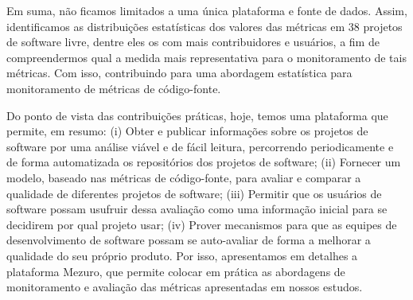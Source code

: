 \documentclass{llncs}
\begin{document}
Em suma, não ficamos limitados a uma única plataforma e fonte de dados. Assim,
identificamos as distribuições estatísticas dos valores das métricas em 38
projetos de software livre, dentre eles os com mais contribuidores e usuários,
a fim de compreendermos qual a medida mais representativa para o monitoramento
de tais métricas.
%
Com isso, contribuindo para uma abordagem estatística para monitoramento de
métricas de código-fonte.

Do ponto de vista das contribuições práticas, hoje, temos uma plataforma que
permite, em resumo: 
% 
(i) Obter e publicar informações sobre os projetos de software por uma análise
viável e de fácil leitura, percorrendo periodicamente e de forma automatizada
os repositórios dos projetos de software; 
% 
(ii) Fornecer um modelo, baseado nas métricas de código-fonte, para avaliar e
comparar a qualidade de diferentes projetos de software; 
% 
(iii) Permitir que os usuários de software possam usufruir dessa avaliação como
uma informação inicial para se decidirem por qual projeto usar; 
%
(iv) Prover mecanismos para que as equipes de desenvolvimento de software
possam se auto-avaliar de forma a melhorar a qualidade do seu próprio produto. 
%
Por isso, apresentamos em detalhes a plataforma Mezuro, que permite colocar em
prática as abordagens de monitoramento e avaliação das métricas apresentadas em
nossos estudos.

\end{document}

